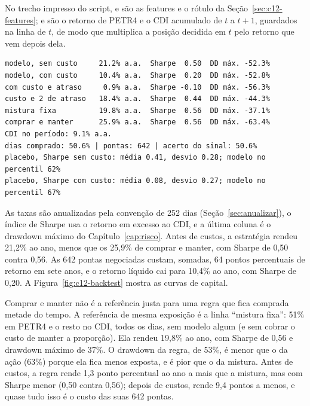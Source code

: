 No trecho impresso do script,  e  são as features e o rótulo da Seção~\ref{sec:c12-features};  e  são o retorno de PETR4 e o CDI acumulado de $t$ a $t+1$, guardados na linha de $t$, de modo que  multiplica a posição decidida em $t$ pelo retorno que vem depois dela.


\begin{lstlisting}[style=saida]
modelo, sem custo     21.2% a.a.  Sharpe  0.50  DD máx. -52.3%
modelo, com custo     10.4% a.a.  Sharpe  0.20  DD máx. -52.8%
com custo e atraso     0.9% a.a.  Sharpe -0.10  DD máx. -56.3%
custo e 2 de atraso   18.4% a.a.  Sharpe  0.44  DD máx. -44.3%
mistura fixa          19.8% a.a.  Sharpe  0.56  DD máx. -37.1%
comprar e manter      25.9% a.a.  Sharpe  0.56  DD máx. -63.4%
CDI no período: 9.1% a.a.
dias comprado: 50.6% | pontas: 642 | acerto do sinal: 50.6%
placebo, Sharpe sem custo: média 0.41, desvio 0.28; modelo no percentil 62%
placebo, Sharpe com custo: média 0.08, desvio 0.27; modelo no percentil 67%
\end{lstlisting}

As taxas são anualizadas pela convenção de 252 dias (Seção~\ref{sec:anualizar}), o índice de Sharpe usa o retorno em excesso ao CDI, e a última coluna é o drawdown máximo do Capítulo~\ref{cap:risco}. Antes de custos, a estratégia rendeu 21,2\% ao ano, menos que os 25,9\% de comprar e manter, com Sharpe de 0,50 contra 0,56. As 642 pontas negociadas custam, somadas, 64 pontos percentuais de retorno em sete anos, e o retorno líquido cai para 10,4\% ao ano, com Sharpe de 0,20. A Figura~\ref{fig:c12-backtest} mostra as curvas de capital.

Comprar e manter não é a referência justa para uma regra que fica comprada metade do tempo. A referência de mesma exposição é a linha ``mistura fixa'': 51\% em PETR4 e o resto no CDI, todos os dias, sem modelo algum (e sem cobrar o custo de manter a proporção). Ela rendeu 19,8\% ao ano, com Sharpe de 0,56 e drawdown máximo de 37\%. O drawdown da regra, de 53\%, é menor que o da ação (63\%) porque ela fica menos exposta, e é pior que o da mistura. Antes de custos, a regra rende 1,3 ponto percentual ao ano a mais que a mistura, mas com Sharpe menor (0,50 contra 0,56); depois de custos, rende 9,4 pontos a menos, e quase tudo isso é o custo das suas 642 pontas.

